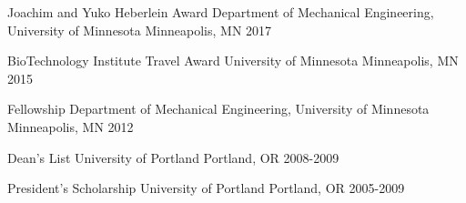 

\begin{cvhonors}


\cvhonor
{Joachim and Yuko Heberlein Award} %
{Department of Mechanical Engineering, University of Minnesota} %
{Minneapolis, MN} %
{2017} %


\cvhonor
{BioTechnology Institute Travel Award} %
{University of Minnesota} %
{Minneapolis, MN} %
{2015} %


\cvhonor
{Fellowship} %
{Department of Mechanical Engineering, University of Minnesota} %
{Minneapolis, MN} %
{2012} %


\cvhonor
{Dean’s List} %
{University of Portland} %
{Portland, OR} %
{2008-2009} %


\cvhonor
{President’s Scholarship} %
{University of Portland} %
{Portland, OR} %
{2005-2009} %

\end{cvhonors}
